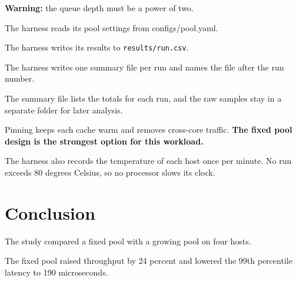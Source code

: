 \textbf{Warning:} the queue depth must be a power of two.

The harness reads its pool settings from configs/pool.yaml.

The harness writes its results to \texttt{results/run.csv}.

The harness writes one summary file per run and
names the file after the run number.

The summary file lists the totals for each run, and the raw samples stay in a separate folder for later analysis.

Pinning keeps each cache warm and removes cross-core traffic. \textbf{The fixed pool design is the strongest option for this workload.}

The harness also records the temperature of each host once per minute. No run exceeds 80 degrees Celsius, so no processor slows its clock.

\section{Conclusion}

The study compared a fixed pool with a growing pool on four hosts.

The fixed pool raised throughput by 24 percent and lowered the 99th percentile latency to 190 microseconds.
